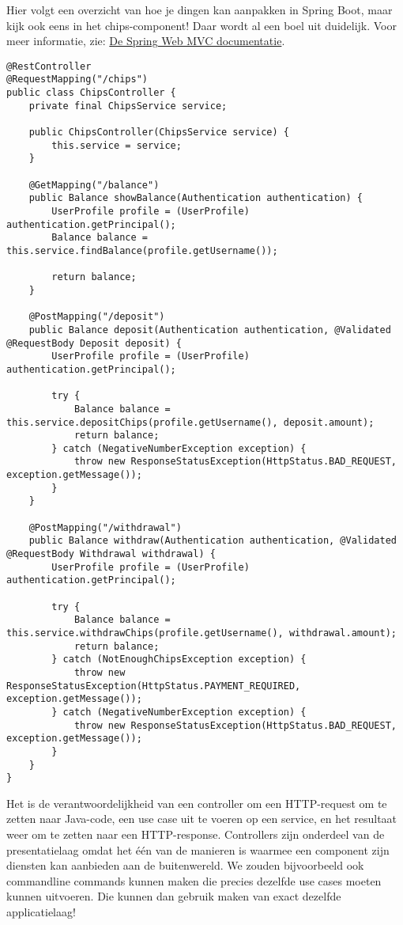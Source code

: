 Hier volgt een overzicht van hoe je dingen kan aanpakken in 
Spring Boot, maar kijk ook eens in het chips-component!
Daar wordt al een boel uit duidelijk. Voor meer informatie, zie:
\href{https://docs.spring.io/spring-framework/docs/5.3.8/reference/html/web.html#mvc-controller}{De Spring Web MVC documentatie}.

\begin{verbatim}
@RestController
@RequestMapping("/chips")
public class ChipsController {
    private final ChipsService service;

    public ChipsController(ChipsService service) {
        this.service = service;
    }

    @GetMapping("/balance")
    public Balance showBalance(Authentication authentication) {
        UserProfile profile = (UserProfile) authentication.getPrincipal();
        Balance balance = this.service.findBalance(profile.getUsername());

        return balance;
    }

    @PostMapping("/deposit")
    public Balance deposit(Authentication authentication, @Validated @RequestBody Deposit deposit) {
        UserProfile profile = (UserProfile) authentication.getPrincipal();

        try {
            Balance balance = this.service.depositChips(profile.getUsername(), deposit.amount);
            return balance;
        } catch (NegativeNumberException exception) {
            throw new ResponseStatusException(HttpStatus.BAD_REQUEST, exception.getMessage());
        }
    }

    @PostMapping("/withdrawal")
    public Balance withdraw(Authentication authentication, @Validated @RequestBody Withdrawal withdrawal) {
        UserProfile profile = (UserProfile) authentication.getPrincipal();

        try {
            Balance balance = this.service.withdrawChips(profile.getUsername(), withdrawal.amount);
            return balance;
        } catch (NotEnoughChipsException exception) {
            throw new ResponseStatusException(HttpStatus.PAYMENT_REQUIRED, exception.getMessage());
        } catch (NegativeNumberException exception) {
            throw new ResponseStatusException(HttpStatus.BAD_REQUEST, exception.getMessage());
        }
    }
}
\end{verbatim}

Het is de verantwoordelijkheid van een controller om een HTTP-request
om te zetten naar Java-code, een use case uit te voeren op een service, 
en het resultaat weer om te zetten naar een HTTP-response. 
Controllers zijn onderdeel van de presentatielaag omdat 
het één van de manieren is waarmee een component zijn diensten kan aanbieden 
aan de buitenwereld. We zouden bijvoorbeeld ook commandline commands kunnen maken 
die precies dezelfde use cases moeten kunnen uitvoeren. Die kunnen dan gebruik 
maken van exact dezelfde applicatielaag!

